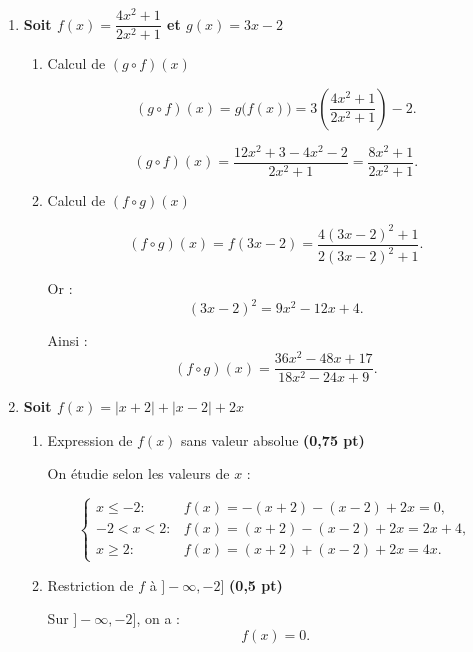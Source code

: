 \documentclass[12pt,a4paper]{article}
\begin{document}
\begin{enumerate}
\begin{enumerate}
\begin{itemize}
\item Pour $x<0$, on exige :
\[
x^2-x \ge 0 \quad \Longleftrightarrow \quad x(x-1)\ge0.
\]
Ce qui donne $x\le0$ ou $x\ge1$.  
En tenant compte de $x<0$, on obtient $x<0$.

\item Pour $x\ge0$, le dénominateur $x^2+3>0$ pour tout $x$.
\end{itemize}

Donc :
\[
\boxed{D_f=\mathbb{R}}
\]

\end{enumerate}

\item \textbf{Soit $f(x)=\dfrac{4x^2+1}{2x^2+1}$ et $g(x)=3x-2$}

\begin{enumerate}

\item Calcul de $(g\circ f)(x)$

\[
(g\circ f)(x)=g\big(f(x)\big)
=3\left(\dfrac{4x^2+1}{2x^2+1}\right)-2.
\]

\[
(g\circ f)(x)
=\dfrac{12x^2+3-4x^2-2}{2x^2+1}
=\boxed{\dfrac{8x^2+1}{2x^2+1}}.
\]

\item Calcul de $(f\circ g)(x)$

\[
(f\circ g)(x)=f(3x-2)
=\dfrac{4(3x-2)^2+1}{2(3x-2)^2+1}.
\]

Or :
\[
(3x-2)^2=9x^2-12x+4.
\]

Ainsi :
\[
(f\circ g)(x)
=\boxed{\dfrac{36x^2-48x+17}{18x^2-24x+9}}.
\]

\end{enumerate}

\item \textbf{Soit $f(x)=|x+2|+|x-2|+2x$}

\begin{enumerate}

\item Expression de $f(x)$ sans valeur absolue \hfill \textbf{(0,75 pt)}

On étudie selon les valeurs de $x$ :

\[
\begin{cases}
x\le -2 : & f(x)=-(x+2)-(x-2)+2x=0,\\[0.2cm]
-2<x<2 : & f(x)=(x+2)-(x-2)+2x=2x+4,\\[0.2cm]
x\ge2 : & f(x)=(x+2)+(x-2)+2x=4x.
\end{cases}
\]

\item Restriction de $f$ à $]-\infty,-2]$ \hfill \textbf{(0,5 pt)}

Sur $]-\infty,-2]$, on a :
\[
\boxed{f(x)=0}.
\]

\end{enumerate}

\end{enumerate}
\end{document}
